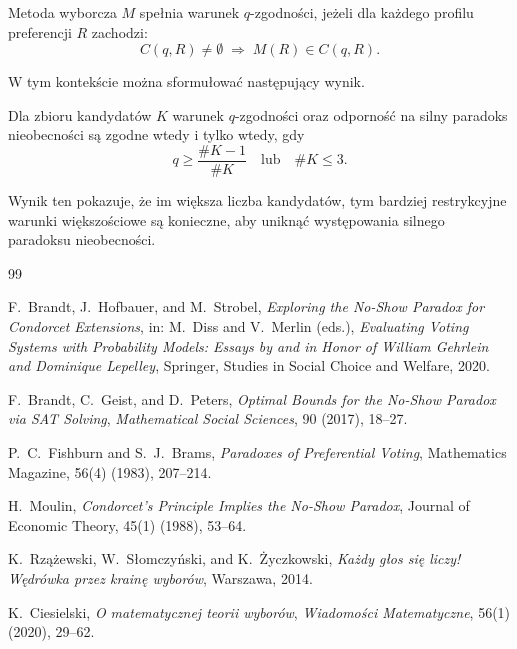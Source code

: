 \documentclass[12pt,a4paper]{mwrep}
\begin{document}
	\begin{definition}
		Metoda wyborcza \(M\) spełnia warunek \(q\)-zgodności, jeżeli dla każdego profilu preferencji \(R\) zachodzi:
		\[
		C(q,R) \neq \emptyset \;\Rightarrow\; M(R) \in C(q,R).
		\]
	\end{definition}
	
	W tym kontekście można sformułować następujący wynik.
	
	\begin{theorem}[Holzman]
		Dla zbioru kandydatów \(K\) warunek \(q\)-zgodności oraz odporność na silny paradoks nieobecności są zgodne wtedy i tylko wtedy, gdy
		\[
		q \ge \frac{\#K - 1}{\#K}
		\quad \text{lub} \quad \#K \le 3.
		\]
	\end{theorem}
	
	Wynik ten pokazuje, że im większa liczba kandydatów, tym bardziej restrykcyjne warunki większościowe są konieczne, aby uniknąć występowania silnego paradoksu nieobecności.
		
	\begin{thebibliography}{99}
		
		F.~Brandt, J.~Hofbauer, and M.~Strobel,
		\textit{Exploring the No-Show Paradox for Condorcet Extensions},
		in: M.~Diss and V.~Merlin (eds.),
		\textit{Evaluating Voting Systems with Probability Models:
			Essays by and in Honor of William Gehrlein and Dominique Lepelley},
		Springer, Studies in Social Choice and Welfare, 2020.
		
		F.~Brandt, C.~Geist, and D.~Peters,
		\textit{Optimal Bounds for the No-Show Paradox via SAT Solving},
		\textit{Mathematical Social Sciences}, 90 (2017), 18--27.
		
		P.~C.~Fishburn and S.~J.~Brams,
		\textit{Paradoxes of Preferential Voting},
		Mathematics Magazine, 56(4) (1983), 207--214.
		
		H.~Moulin,
		\textit{Condorcet’s Principle Implies the No-Show Paradox},
		Journal of Economic Theory, 45(1) (1988), 53--64.
		
		K.~Rzążewski, W.~Słomczyński, and K.~Życzkowski,
		\textit{Każdy głos się liczy! Wędrówka przez krainę wyborów}, Warszawa, 2014.
		
		K.~Ciesielski,
		\textit{O matematycznej teorii wyborów},
		\textit{Wiadomości Matematyczne}, 56(1) (2020), 29--62.
		
	\end{thebibliography}
	
\end{document}
